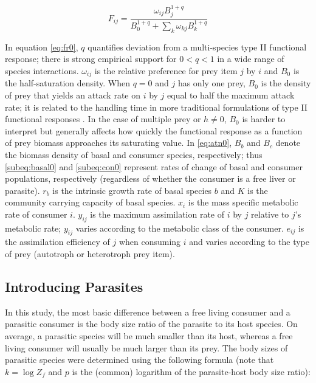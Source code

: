\documentclass[/home/nkappler/Research/Dissertation/dissertation.tex]{subfiles}
\begin{document}
\begin{bibunit}
\begin{equation}
    F_{ij} = \frac{\omega_{ij}B_j^{1+q}}{B_0^{1+q} + \sum_k\omega_{kj}B_k^{1+q}}\label{eq:fr0}
\end{equation}

In equation \ref{eq:fr0}, $q$ quantifies deviation from a multi-species type II
functional response; there is strong empirical support for $0<q<1$ in a wide
range of species interactions. $\omega_{ij}$ is the relative preference for
prey item $j$ by $i$ and $B_0$ is the half-saturation density. When $q=0$ and
$j$ has only one prey, $B_0$ is the density of prey that yields an attack rate
on $i$ by $j$ equal to half the maximum attack rate; it is related to the
handling time in more traditional formulations of type II functional responses
\cite{Holling1959}. In the case of multiple prey or $h\neq0$, $B_0$ is harder to
interpret but generally affects how quickly the functional response as a
function of prey biomass approaches its saturating value. In \eqref{eq:atn0},
$B_b$ and $B_c$ denote the biomass density of basal and consumer species,
respectively; thus \eqref{subeq:basal0} and \eqref{subeq:con0} represent rates
of change of basal and consumer populations, respectively (regardless of
whether the consumer is a free liver or parasite).  $r_b$ is the intrinsic
growth rate of basal species $b$ and $K$ is the community carrying capacity of
basal species. $x_i$ is the mass specific metabolic rate of consumer $i$.
$y_{ij}$ is the maximum assimilation rate of $i$ by $j$ relative to $j$'s
metabolic rate; $y_{ij}$ varies according to the metabolic class of the
consumer. $e_{ij}$ is the assimilation efficiency of $j$ when consuming $i$ and
varies according to the type of prey (autotroph or heterotroph prey item).  



\subsection{Introducing Parasites\label{subsec:paraIntro}}
 
 In this study, the most basic difference between a free living consumer and a
 parasitic consumer is the body size ratio of the parasite to its host species.
 On average, a parasitic species will be much smaller than its host, whereas a
 free living consumer will usually be much larger than its prey. The body sizes
 of parasitic species were determined using the following formula (note that $k
 = \log Z_{\!f}$ and $p$ is the (common) logarithm of the parasite-host body size
 ratio):


\end{bibunit}
\end{document}
